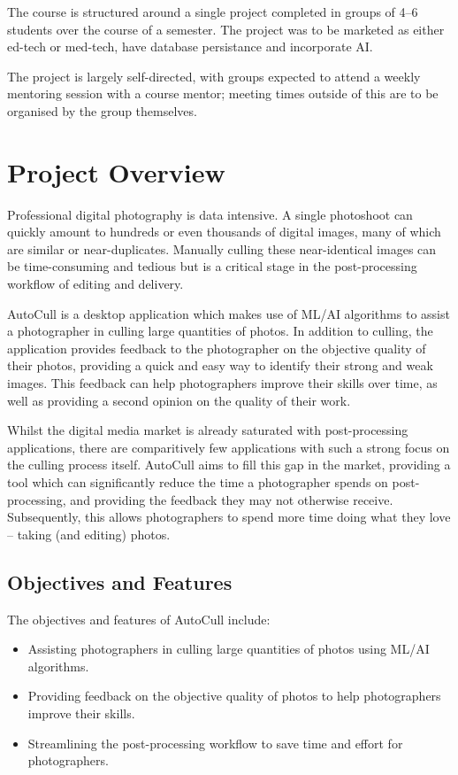 \documentclass[conference]{IEEEtran}
\begin{document}
The course is structured around a single project completed in groups of 4–6 students over the course of a semester. The project was to be marketed as either ed-tech or med-tech, have database persistance and incorporate AI.

The project is largely self-directed, with groups expected to attend a weekly mentoring session with a course mentor; meeting times outside of this are to be organised by the group themselves.


\section{Project Overview}
Professional digital photography is data intensive. A single photoshoot can quickly amount to hundreds or even thousands of digital images, many of which are similar or near-duplicates. Manually culling these near-identical images can be time-consuming and tedious but is a critical stage in the post-processing workflow of editing and delivery. 

AutoCull is a desktop application which makes use of ML/AI algorithms to assist a photographer in culling large quantities of photos. In addition to culling, the application provides feedback to the photographer on the objective quality of their photos, providing a quick and easy way to identify their strong and weak images. This feedback can help photographers improve their skills over time, as well as providing a second opinion on the quality of their work.

Whilst the digital media market is already saturated with post-processing applications, there are comparitively few applications with such a strong focus on the culling process itself. AutoCull aims to fill this gap in the market, providing a tool which can significantly reduce the time a photographer spends on post-processing, and providing the feedback they may not otherwise receive. Subsequently, this allows photographers to spend more time doing what they love – taking (and editing) photos.

\subsection{Objectives and Features}
The objectives and features of AutoCull include:

\begin{itemize}
    \item Assisting photographers in culling large quantities of photos using ML/AI algorithms.
    \item Providing feedback on the objective quality of photos to help photographers improve their skills.
    \item Streamlining the post-processing workflow to save time and effort for photographers.
\end{itemize}
\end{document}
